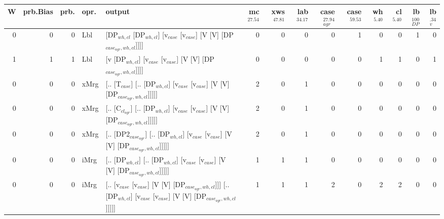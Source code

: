 \begin{tabularx}{\linewidth}{rrrlXrrrrrrrrr}
\hline
   W &   prb.Bias &   prb. & opr.   & output                                                                                                           &   mc$^{27.54}$ &   xws$^{47.81}$ &   lab$^{34.17}$ &   case$_{agr}^{27.94}$ &   case$^{59.53}$ &   wh$^{5.40}$ &   cl$^{5.40}$ &   lb$_{DP}^{100}$ &   lb$_{v}^{.34}$ \\
\hline
   0 &       0 &   0 & Lbl  & [DP$_{wh,cl}$ [DP$_{wh,cl}$] [v$_{case}$ [v$_{case}$] [V [V] [DP$_{case_{agr},wh,cl}$]]]]                                              &            0 &             0 &             0 &                  0 &              1 &           0 &           0 &                1 &             0 \\
   1 &       1 &   1 & Lbl  & [v [DP$_{wh,cl}$] [v$_{case}$ [v$_{case}$] [V [V] [DP$_{case_{agr},wh,cl}$]]]]                                                     &            0 &             0 &             0 &                  0 &              0 &           1 &           1 &                0 &             1 \\
   0 &       0 &   0 & xMrg & [.. [T$_{case}$] [.. [DP$_{wh,cl}$] [v$_{case}$ [v$_{case}$] [V [V] [DP$_{case_{agr},wh,cl}$]]]]]                                      &            2 &             0 &             1 &                  0 &              0 &           0 &           0 &                0 &             0 \\
   0 &       0 &   0 & xMrg & [.. [C$_{cl_{agr}}$] [.. [DP$_{wh,cl}$] [v$_{case}$ [v$_{case}$] [V [V] [DP$_{case_{agr},wh,cl}$]]]]]                                    &            2 &             0 &             1 &                  0 &              0 &           0 &           0 &                0 &             0 \\
   0 &       0 &   0 & xMrg & [.. [DP2$_{case_{agr}}$] [.. [DP$_{wh,cl}$] [v$_{case}$ [v$_{case}$] [V [V] [DP$_{case_{agr},wh,cl}$]]]]]                                &            2 &             0 &             1 &                  0 &              0 &           0 &           0 &                0 &             0 \\
   0 &       0 &   0 & iMrg & [.. [DP$_{wh,cl}$] [.. [DP$_{wh,cl}$] [v$_{case}$ [v$_{case}$] [V [V] [DP$_{case_{agr},wh,cl}$]]]]]                                    &            1 &             1 &             1 &                  0 &              0 &           0 &           0 &                0 &             0 \\
   0 &       0 &   0 & iMrg & [.. [v$_{case}$ [v$_{case}$] [V [V] [DP$_{case_{agr},wh,cl}$]]] [.. [DP$_{wh,cl}$] [v$_{case}$ [v$_{case}$] [V [V] [DP$_{case_{agr},wh,cl}$]]]]] &            1 &             1 &             1 &                  2 &              0 &           2 &           2 &                0 &             0 \\

\end{tabularx}
